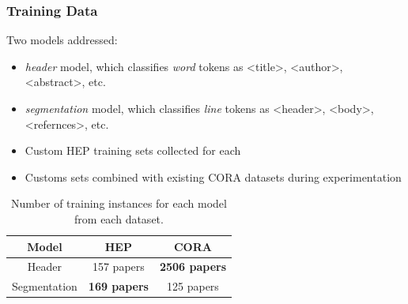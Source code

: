 \documentclass{beamer}
\begin{document}
\begin{frame}
\frametitle{Training Data}

Two models addressed:
\begin{itemize}
\item \emph{header} model, which classifies \emph{word} tokens as <title>, <author>, <abstract>, etc.
\item \emph{segmentation} model, which classifies \emph{line} tokens as <header>, <body>, <refernces>, etc.
\item Custom HEP training sets collected for each
\item Customs sets combined with existing CORA datasets during experimentation

\end{itemize}

\begin{table}[h]
\begin{center}
\begin{tabular}{|c|c|c|}
\hline
Model & HEP & CORA \\
\hline
Header & 157 papers & \textbf{2506 papers} \\
\hline
Segmentation & \textbf{169 papers} & 125 papers \\
\hline
\end{tabular}
\caption[Number of training instances for each model from each dataset.]{Number of training instances for each model from each dataset.}
\end{center}
\end{table}
\end{frame}

\end{document}
